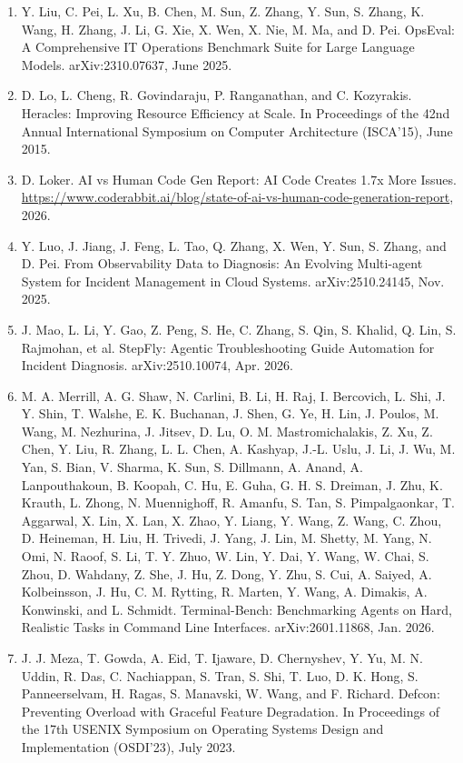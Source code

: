 \documentclass[11pt,UTF8,fontset=fandol]{ctexart}
\begin{document}
\begin{enumerate}[leftmargin=2.2em,labelsep=0.4em,itemsep=0.15em]
\item Y. Liu, C. Pei, L. Xu, B. Chen, M. Sun, Z. Zhang, Y. Sun, S. Zhang, K. Wang, H. Zhang, J. Li, G. Xie, X. Wen, X. Nie, M. Ma, and D. Pei. OpsEval: A Comprehensive IT Operations Benchmark Suite for Large Language Models. arXiv:2310.07637, June 2025.
\item D. Lo, L. Cheng, R. Govindaraju, P. Ranganathan, and C. Kozyrakis. Heracles: Improving Resource Efficiency at Scale. In Proceedings of the 42nd Annual International Symposium on Computer Architecture (ISCA'15), June 2015.
\item D. Loker. AI vs Human Code Gen Report: AI Code Creates 1.7x More Issues. \url{https://www.coderabbit.ai/blog/state-of-ai-vs-human-code-generation-report}, 2026.
\item Y. Luo, J. Jiang, J. Feng, L. Tao, Q. Zhang, X. Wen, Y. Sun, S. Zhang, and D. Pei. From Observability Data to Diagnosis: An Evolving Multi-agent System for Incident Management in Cloud Systems. arXiv:2510.24145, Nov. 2025.
\item J. Mao, L. Li, Y. Gao, Z. Peng, S. He, C. Zhang, S. Qin, S. Khalid, Q. Lin, S. Rajmohan, et al. StepFly: Agentic Troubleshooting Guide Automation for Incident Diagnosis. arXiv:2510.10074, Apr. 2026.
\item M. A. Merrill, A. G. Shaw, N. Carlini, B. Li, H. Raj, I. Bercovich, L. Shi, J. Y. Shin, T. Walshe, E. K. Buchanan, J. Shen, G. Ye, H. Lin, J. Poulos, M. Wang, M. Nezhurina, J. Jitsev, D. Lu, O. M. Mastromichalakis, Z. Xu, Z. Chen, Y. Liu, R. Zhang, L. L. Chen, A. Kashyap, J.-L. Uslu, J. Li, J. Wu, M. Yan, S. Bian, V. Sharma, K. Sun, S. Dillmann, A. Anand, A. Lanpouthakoun, B. Koopah, C. Hu, E. Guha, G. H. S. Dreiman, J. Zhu, K. Krauth, L. Zhong, N. Muennighoff, R. Amanfu, S. Tan, S. Pimpalgaonkar, T. Aggarwal, X. Lin, X. Lan, X. Zhao, Y. Liang, Y. Wang, Z. Wang, C. Zhou, D. Heineman, H. Liu, H. Trivedi, J. Yang, J. Lin, M. Shetty, M. Yang, N. Omi, N. Raoof, S. Li, T. Y. Zhuo, W. Lin, Y. Dai, Y. Wang, W. Chai, S. Zhou, D. Wahdany, Z. She, J. Hu, Z. Dong, Y. Zhu, S. Cui, A. Saiyed, A. Kolbeinsson, J. Hu, C. M. Rytting, R. Marten, Y. Wang, A. Dimakis, A. Konwinski, and L. Schmidt. Terminal-Bench: Benchmarking Agents on Hard, Realistic Tasks in Command Line Interfaces. arXiv:2601.11868, Jan. 2026.
\item J. J. Meza, T. Gowda, A. Eid, T. Ijaware, D. Chernyshev, Y. Yu, M. N. Uddin, R. Das, C. Nachiappan, S. Tran, S. Shi, T. Luo, D. K. Hong, S. Panneerselvam, H. Ragas, S. Manavski, W. Wang, and F. Richard. Defcon: Preventing Overload with Graceful Feature Degradation. In Proceedings of the 17th USENIX Symposium on Operating Systems Design and Implementation (OSDI'23), July 2023.

\end{enumerate}
\end{document}
